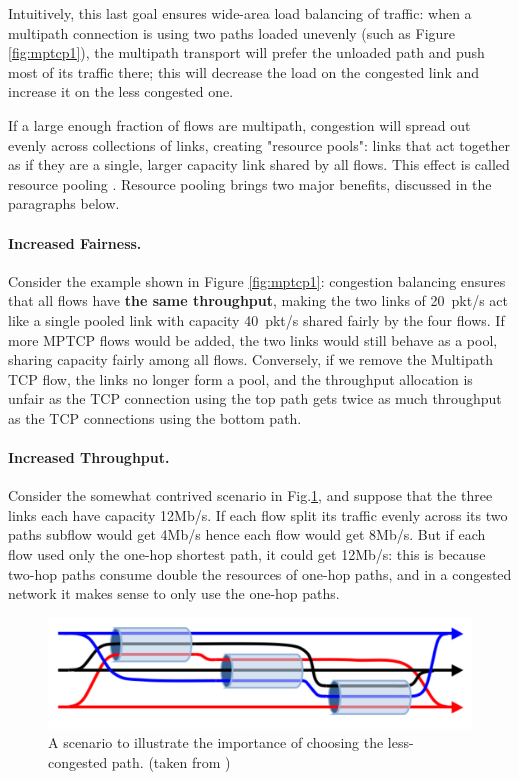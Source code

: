 Intuitively, this last goal ensures wide-area load balancing of traffic: 
when a multipath connection is using two paths loaded unevenly (such as 
Figure \ref{fig:mptcp1}), the multipath transport will prefer the unloaded path
and push most of its traffic there; this will decrease the load on the 
congested link and increase it on the less congested one. 

If a large enough fraction of flows are multipath, congestion will spread 
out evenly across collections of links, creating "resource pools": links 
that act together as if they are a single, larger capacity link shared by 
all flows. This effect is called resource pooling \cite{pooling}.
Resource pooling brings two major benefits, discussed in the paragraphs below.

\paragraph{Increased Fairness.} 
Consider the example shown in Figure \ref{fig:mptcp1}: congestion
balancing ensures that all flows have \textbf{the same throughput}, making
the two links of 20~pkt/s act like a single pooled link with capacity 40~pkt/s 
shared fairly by the four flows. If more MPTCP flows would be added, the two links would still behave as a pool,
sharing capacity fairly among all flows. 
Conversely, if we remove the Multipath TCP flow, the links no longer form a pool, and the throughput allocation
is unfair as the TCP connection using the top path gets twice as much throughput as the TCP connections using the bottom path.


\paragraph{Increased Throughput.}
Consider the somewhat contrived scenario in Fig.\ref{fig:klingon},
and suppose that the three links each have capacity 12Mb/s.
If each flow split its traffic evenly
across its two paths subflow would get 4Mb/s 
hence each flow would get 8Mb/s. But if each flow used only 
the one-hop shortest path, it could get 12Mb/s: this is because
two-hop paths consume double the resources of one-hop paths,
and in a congested network it makes sense to only use the one-hop paths.

\begin{figure}[tb]
\centering
\includegraphics*[width=0.8\columnwidth]{figures/3pipes}
\caption{A scenario to illustrate the importance of choosing the
  less-congested path. (taken from \cite{mptcp-cc})}
\label{fig:klingon}
\end{figure}

